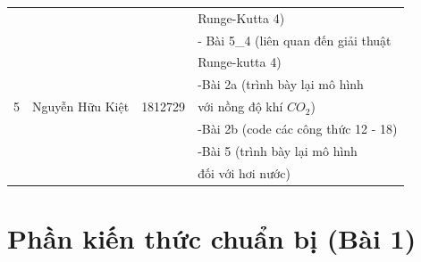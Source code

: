 \documentclass[a4paper]{article}
\begin{document}
\begin{table}[ht]
\begin{tabular}{|c|c|c|l|}
& & &Runge-Kutta 4)\\
& &  & - Bài 5\_4 (liên quan đến giải thuật \\
& & &Runge-kutta 4)\\
\hline
\multirow{3}{*}{5} & \multirow{3}{*}{Nguyễn Hữu Kiệt} & \multirow{3}{*}{1812729} &
-Bài 2a (trình bày lại mô hình \\
& & &với nồng độ khí $CO_2$)\\
& & &-Bài 2b (code các công thức 12 - 18)\\
& & &-Bài 5 (trình bày lại mô hình \\
& & &đối với hơi nước)\\

\hline
\end{tabular}
\end{table}

\section{Phần kiến thức chuẩn bị (Bài 1)}
\end{document}
